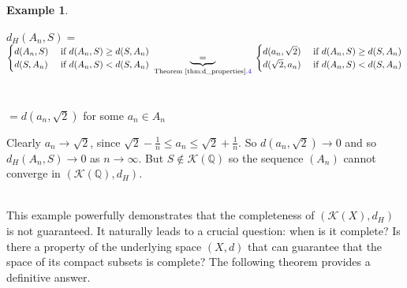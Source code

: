 \documentclass{article}
\theoremstyle{plain}
\theoremstyle{definition}
\newtheorem*{ex}{Example}
\theoremstyle{remark}
\begin{document}
\begin{ex}
\begin{center}
    $d_H (A_n, S) =$
    $
    \begin{cases}
        d(A_n, S) & \text{ if } d(A_n, S) \ge d(S, A_n) \\ d(S, A_n) & \text{ if } d(A_n, S) < d(S, A_n)
    \end{cases} \underbrace{\ \ \  = \ \ \ }_{\text{   Theorem~\ref{thm:d_properties}\textcolor{blue}{.4}  }} \begin{cases}
        d(a_n, \sqrt{2}) & \text{ if } d(A_n, S) \ge d(S, A_n) \\ d(\sqrt{2}, a_n) & \text{ if } d(A_n, S) < d(S, A_n)
    \end{cases} $ \\ ~\\ ~\\ $= d(a_n, \sqrt{2})
    $ for some $a_n \in A_n$
\end{center}
Clearly $a_n \to \sqrt{2}$, since $\sqrt{2} - \frac{1}{n} \le a_n \le \sqrt{2} + \frac{1}{n}$. So $d(a_n, \sqrt{2}) \to 0$ and so $d_H(A_n, S) \to 0$ as $n\to \infty$. But $S \notin \mathcal{K}(\mathbb{Q})$ so the sequence $(A_n)$ cannot converge in $(\mathcal{K}(\mathbb{Q}), d_H)$.
\end{ex}
~\\
This example powerfully demonstrates that the completeness of $(\mathcal{K}(X),d_H)$ is not guaranteed. It naturally leads to a crucial question: when is it complete? Is there a property of the underlying space $(X,d)$ that can guarantee that the space of its compact subsets is complete? The following theorem provides a definitive answer.
\end{document}
